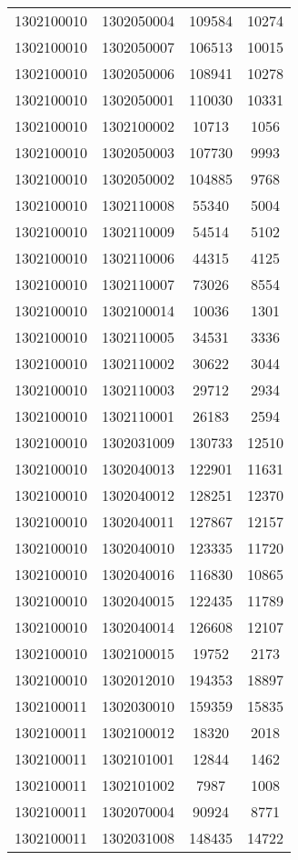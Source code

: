 \begin{longtable}{llcc}
1302100010 & 1302050004 & 109584 & 10274\\
1302100010 & 1302050007 & 106513 & 10015\\
1302100010 & 1302050006 & 108941 & 10278\\
1302100010 & 1302050001 & 110030 & 10331\\
1302100010 & 1302100002 & 10713 & 1056\\
1302100010 & 1302050003 & 107730 & 9993\\
1302100010 & 1302050002 & 104885 & 9768\\
1302100010 & 1302110008 & 55340 & 5004\\
1302100010 & 1302110009 & 54514 & 5102\\
1302100010 & 1302110006 & 44315 & 4125\\
1302100010 & 1302110007 & 73026 & 8554\\
1302100010 & 1302100014 & 10036 & 1301\\
1302100010 & 1302110005 & 34531 & 3336\\
1302100010 & 1302110002 & 30622 & 3044\\
1302100010 & 1302110003 & 29712 & 2934\\
1302100010 & 1302110001 & 26183 & 2594\\
1302100010 & 1302031009 & 130733 & 12510\\
1302100010 & 1302040013 & 122901 & 11631\\
1302100010 & 1302040012 & 128251 & 12370\\
1302100010 & 1302040011 & 127867 & 12157\\
1302100010 & 1302040010 & 123335 & 11720\\
1302100010 & 1302040016 & 116830 & 10865\\
1302100010 & 1302040015 & 122435 & 11789\\
1302100010 & 1302040014 & 126608 & 12107\\
1302100010 & 1302100015 & 19752 & 2173\\
1302100010 & 1302012010 & 194353 & 18897\\
1302100011 & 1302030010 & 159359 & 15835\\
1302100011 & 1302100012 & 18320 & 2018\\
1302100011 & 1302101001 & 12844 & 1462\\
1302100011 & 1302101002 & 7987 & 1008\\
1302100011 & 1302070004 & 90924 & 8771\\
1302100011 & 1302031008 & 148435 & 14722\\

\end{longtable}
